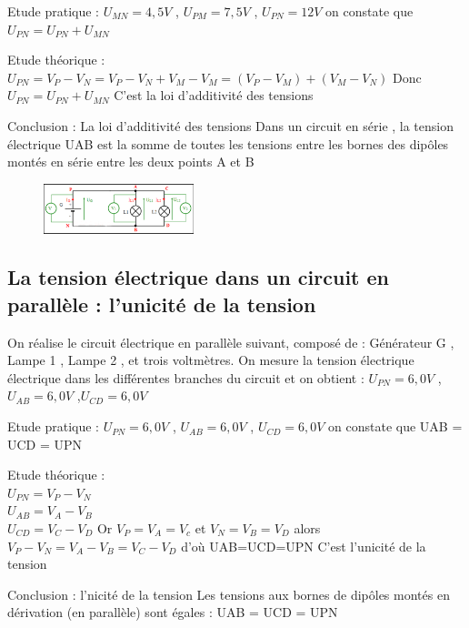 \documentclass[12pt]{article}
\begin{document}
Etude pratique : $U_{MN} = 4,5 V$ , $U_{PM} = 7,5 V$ , $U_{PN} = 12 V$ on constate que $U_{PN} = U_{PN} + U_{MN}$

Etude théorique :
$U_{PN}=V_P - V_N = V_P - V_N + V_M - V_M = ( V_P - V_M ) + ( V_M - V_N )$
Donc $U_{PN} = U_{PN} + U_{MN}$
C’est la loi d’additivité des tensions

\begin{tcolorbox}
Conclusion : La loi d’additivité des tensions
Dans un circuit en série , la tension électrique UAB est la somme de toutes les tensions entre les bornes des
dipôles montés en série entre les deux points A et B
\end{tcolorbox}



\begin{figure}

\includegraphics[width=0.39\textwidth]{./img/img_circuit_para_05.png}
\end{figure}


\subsection{La tension électrique dans un circuit en parallèle : l’unicité de la tension}
On réalise le circuit électrique en parallèle suivant, composé de : Générateur G , Lampe 1 , Lampe 2 , et trois
voltmètres. On mesure la tension électrique électrique
dans les différentes branches du circuit et on obtient :
$U_{PN} = 6,0 V$ , $U_{AB} = 6,0 V$ ,$ U_{CD}= 6,0 V$

Etude pratique : $U_{PN} = 6,0 V$ , $U_{AB} = 6,0 V$ , $U_{CD}= 6,0 V$
on constate que UAB = UCD = UPN

Etude théorique :
\\$U_{PN} = V_P - V_N$
\\$U_{AB} = V_A - V_B$
\\$U_{CD} = V_C - V_D$ Or $V_P = V_A = V_c$ et $V_N = V_B = V_D$ alors $V_P - V_N = V_A - V_B = V_C - V_D$ d’où UAB=UCD=UPN C’est l’unicité de la tension

\begin{tcolorbox}
  Conclusion : l’nicité de la tension
Les tensions aux bornes de dipôles montés en dérivation (en parallèle) sont égales : UAB = UCD = UPN
\end{tcolorbox}
\end{document}
